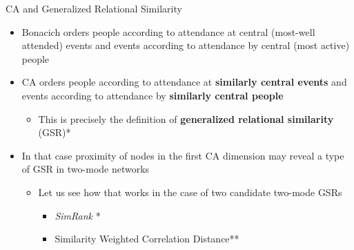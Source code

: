 \documentclass[
  ignorenonframetext,
]{beamer}
\providecommand{\tightlist}{%
  \setlength{\itemsep}{0pt}\setlength{\parskip}{0pt}}\usepackage{longtable,booktabs,array}
\begin{document}
\begin{frame}{CA and Generalized Relational Similarity}
\protect\hypertarget{ca-and-generalized-relational-similarity}{}
\begin{itemize}
\tightlist
\item
  Bonacich orders people according to attendance at central (most-well
  attended) events and events according to attendance by central (most
  active) people
\item
  CA orders people according to attendance at \textbf{similarly central
  events} and events according to attendance by \textbf{similarly
  central people}

  \begin{itemize}
  \tightlist
  \item
    This is precisely the definition of \textbf{generalized relational
    similarity} (GSR)*
  \end{itemize}
\end{itemize}

\pause

\begin{itemize}
\tightlist
\item
  In that case proximity of nodes in the first CA dimension may reveal a
  type of GSR in two-mode networks

  \begin{itemize}
  \tightlist
  \item
    Let us see how that works in the case of two candidate two-mode GSRs

    \begin{itemize}
    \tightlist
    \item
      \emph{SimRank} *
    \item
      Similarity Weighted Correlation Distance**
    \end{itemize}
  \end{itemize}
\end{itemize}

\end{frame}
\end{document}
